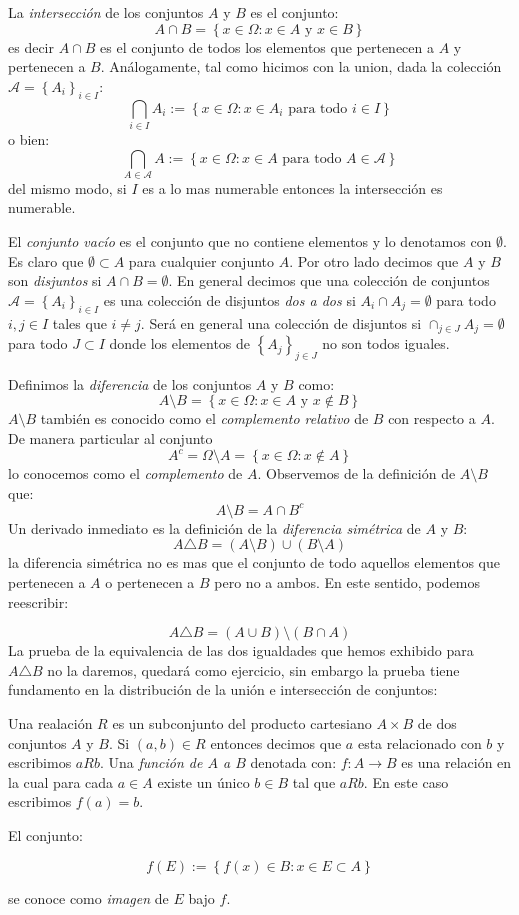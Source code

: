 \documentclass[14pt]{extbook}
\begin{document}
La \emph{intersección} de los conjuntos $A$ y $B$ es el conjunto:
$$
A\cap B = \left\{x\in \Omega: x \in A \text{ y } x \in B\right\}
$$
es decir $A\cap B$ es el conjunto de todos los elementos que pertenecen a $A$ y pertenecen a $B$. Análogamente, tal como hicimos con la union, dada la colección $\mathcal{A} = \left\{A_i\right\}_{i\in I}$:
$$
\bigcap_{i\in I}A_i := \left\{x\in \Omega: x \in A_i \text{ para todo } i\in I \right\}
$$
\noindent
o bien:
\noindent
$$
\bigcap_{A\in \mathcal{A}}A := \left\{x\in \Omega: x \in A \text{ para todo } A\in \mathcal{A} \right\}
$$
del mismo modo, si $I$ es a lo mas numerable entonces la intersección es numerable.

El \emph{conjunto vacío} es el conjunto que no contiene elementos y lo denotamos con $\emptyset$. Es claro que $\emptyset \subset A$ para cualquier conjunto $A$. Por otro lado decimos que $A$ y $B$ son \emph{disjuntos} si $A\cap B = \emptyset$. En general decimos que una colección de conjuntos $\mathcal{A} = \left\{A_i\right\}_{i\in I}$ es una colección de disjuntos \emph{dos a dos} si $A_i\cap A_j = \emptyset$ para todo $i, j\in I$ tales que $i\neq j$. Será en general una colección de disjuntos si $\cap_{j\in J} A_j = \emptyset$ para todo $J \subset I$ donde los elementos de $\left\{A_j\right\}_{j\in J}$ no son todos iguales.

Definimos la \emph{diferencia} de los conjuntos $A$ y $B$ como:
$$
A\setminus B = \left\{x\in \Omega: x  \in A \text{ y } x\notin B\right\}
$$
$A\setminus B$ también es conocido como el \emph{complemento relativo} de $B$ con respecto a $A$. De manera particular al conjunto 
$$
A^c = \Omega\setminus A = \left\{x\in \Omega: x\notin A\right\}
$$
lo conocemos como el \emph{complemento} de $A$.
Observemos de la definición de $A\setminus B$ que:
$$
A\setminus B = A \cap B^c
$$
Un derivado inmediato es la definición de la \emph{diferencia simétrica} de $A$ y $B$:
$$
A\triangle B = (A\setminus B) \cup (B\setminus A)
$$
la diferencia simétrica no es mas que el conjunto de todo aquellos elementos que pertenecen a $A$ o pertenecen a $B$ pero no a ambos. En este sentido, podemos reescribir:

$$
A\triangle B = (A\cup B) \setminus (B\cap A)
$$
La prueba de la equivalencia de las dos igualdades que hemos exhibido para $A\triangle B$ no la daremos, quedará como ejercicio, sin embargo la prueba tiene fundamento en la distribución de la unión e intersección de conjuntos:

\noindent\hrulefill

Una realación $R$ es un subconjunto del producto cartesiano $A\times B$ de dos conjuntos $A$ y $B$. Si $(a,b)\in R$ entonces decimos que $a$ esta relacionado con $b$ y escribimos $aRb$. Una \emph{función de $A$ a $B$} denotada con: $f:A\to B$ es una relación en la cual para cada $a\in A$ existe un único $b\in B$ tal que $aRb$. En este caso escribimos $f(a) = b$.

El conjunto:

$$
f(E) := \left\{f(x)\in B: x\in E\subset A\right\} 
$$

se conoce como \emph{imagen} de $E$ bajo $f$.
\end{document}
